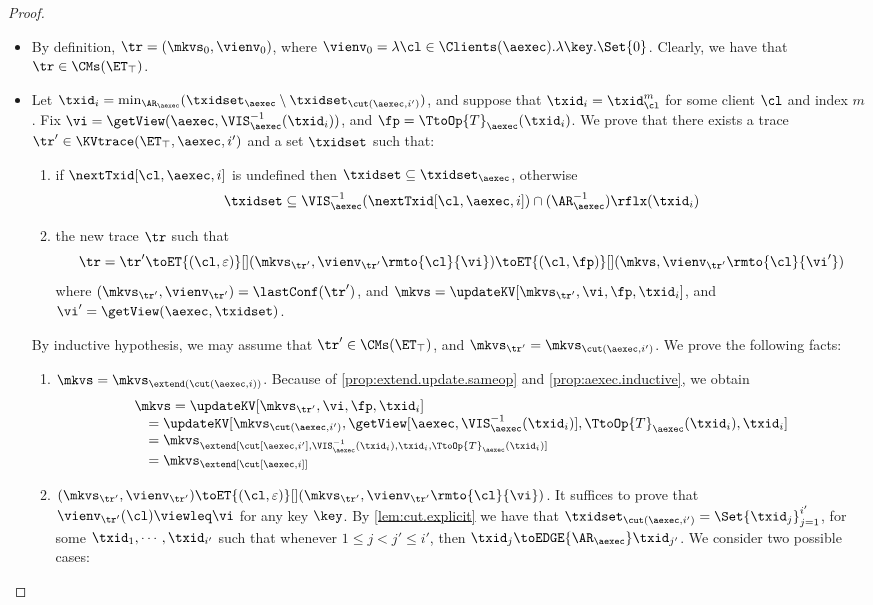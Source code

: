 \begin{proof}
\begin{itemize}
\item {} By definition, $\tr = (\mkvs_{0}, \vienv_{0})$, 
where $\vienv_{0} = \lambda \cl \in \Clients(\aexec). \lambda \key.\Set{0}$. 
Clearly, we have that $\tr \in \CMs(\ET_{\top})$. 
\item {} Let $\txid_{i} = \min_{\AR_{\aexec}}(\txidset_{\aexec} \setminus \txidset_{\cut(\aexec, i')})$, 
and suppose that $\txid_{i} = \txid_{\cl}^{m}$ for some client $\cl$ and index $m$. 
Fix $\vi = \getView(\aexec, \VIS_{\aexec}^{-1}(\txid_{i}))$, and  $\fp = \TtoOp{T}_{\aexec}(\txid_{i})$.
We prove that there exists a trace $\tr' \in \KVtrace(\ET_{\top}, \aexec, i')$ and a set 
$\txidset$ such that: 
\begin{enumerate}
\item if $\nextTxid[\cl, \aexec, i]$ is undefined then $\txidset \subseteq \txidset_{\aexec}$, otherwise 
\[
    \txidset \subseteq \VIS^{-1}_{\aexec}(\nextTxid[\cl, \aexec, i]) \cap (\AR_{\aexec}^{-1})\rflx(\txid_{i})
\]
\item the new trace \( \tr \) such that
\[
    \tr = \tr' \toET{(\cl, \varepsilon)}[] (\mkvs_{\tr'}, \vienv_{\tr'}\rmto{\cl}{\vi}) \toET{(\cl, \fp)}[] 
(\mkvs,  \vienv_{\tr'}\rmto{\cl}{\vi'})
\]
where $(\mkvs_{\tr'}, \vienv_{\tr'}) = \lastConf(\tr')$, and $\mkvs = \updateKV[\mkvs_{\tr'}, \vi, \fp, \txid_{i}]$, 
and $\vi' = \getView(\aexec, \txidset)$.
\end{enumerate}
By inductive hypothesis, we may assume that $\tr' \in \CMs(\ET_{\top})$, and $\mkvs_{\tr'} = \mkvs_{\cut(\aexec, i')}$. 
We prove the following facts: 
\begin{enumerate}
\item $\mkvs = \mkvs_{\extend(\cut(\aexec, i))}$. 
Because of \cref{prop:extend.update.sameop} and \cref{prop:aexec.inductive},
we obtain 
\[
\begin{array}{l}
\mkvs = \updateKV[\mkvs_{\tr'}, \vi, \fp, \txid_{i}] \\
\quad = \updateKV[\mkvs_{\cut(\aexec, i')}, \getView[\aexec, \VIS^{-1}_{\aexec}(\txid_{i})], \TtoOp{T}_{\aexec}(\txid_{i}), \txid_{i}] \\
\quad = \mkvs_{\extend[\cut[\aexec, i'], \VIS^{-1}_{\aexec}(\txid_{i}), \txid_{i}, \TtoOp{T}_{\aexec}(\txid_{i})] } \\
\quad = \mkvs_{\extend[\cut[\aexec, i]]}
\end{array}
\]

\item $(\mkvs_{\tr'}, \vienv_{\tr'}) \toET{(\cl, \varepsilon)}[] (\mkvs_{\tr'}, \vienv_{\tr'}\rmto{\cl}{\vi})$. 
It suffices to prove that $\vienv_{\tr'}(\cl) \viewleq \vi$ for any key $\key$.
By \cref{lem:cut.explicit} we have that $\txidset_{\cut(\aexec, i')} = \Set{\txid_{j}}_{j=1}^{i'}$, for 
some $\txid_{1},\cdots, \txid_{i'}$ such that whenever $1 \leq j < j' \leq i'$, then 
$\txid_{j} \toEDGE{\AR_{\aexec}} \txid_{j'}$. We consider two possible cases: 


\end{enumerate}
\end{itemize}
\end{proof}
